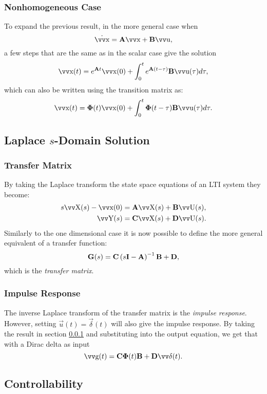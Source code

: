 \subsubsection{Nonhomogeneous Case} \label{sec:ss-sol-time-nonh}

To expand the previous result, in the more general case when
\[
	\dot{\vec{x}} = \mx{A} \vec{x} + \mx{B} \vec{u},
\]
a few steps that are the same as in the scalar case give the solution
\[
	\vec{x}(t) = e^{\mx{A} t} \vec{x}(0)
		+ \int_0^t e^{\mx{A} (t - \tau)} \mx{B} \vec{u}(\tau) d\tau,
\]
which can also be written using the transition matrix as:
\[
	\vec{x}(t) = \mx{\Phi}(t) \vec{x}(0)
		+ \int_0^t \mx{\Phi}(t - \tau) \mx{B} \vec{u}(\tau) d\tau.
\]

\subsection{Laplace \(s\)-Domain Solution}

\subsubsection{Transfer Matrix}

By taking the Laplace transform the state space equations of an LTI system they become:
\begin{align*}
	s\vec{X}(s) - \vec{x}(0) & = \mx{A} \vec{X}(s) + \mx{B} \vec{U}(s), \\
	\vec{Y}(s)              & = \mx{C} \vec{X}(s) + \mx{D} \vec{U}(s).
\end{align*}
Similarly to the one dimensional case it is now possible to define the more general equivalent of a transfer function:
\[
	\bm{\mathrm{G}}(s) = \bm{\mathrm{C}}\left(s\bm{\mathrm{I}} - \bm{\mathrm{A}}\right)^{-1} \bm{\mathrm{B}} + \bm{\mathrm{D}},
\]
which is the \emph{transfer matrix}.

\subsubsection{Impulse Response}

The inverse Laplace transform of the transfer matrix is the \emph{impulse response}. However, setting \(\vec{u}(t) = \vec{\delta}(t)\) will also give the impulse response. By taking the result in section \ref{sec:ss-sol-time-nonh} and substituting into the output equation, we get that with a Dirac delta as input
\[
	\vec{g}(t) = \mx{C} \mx{\Phi}(t) \mx{B} + \mx{D} \vec{\delta}(t).
\]

\subsection{Controllability}

